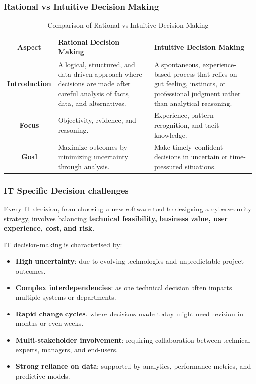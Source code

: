 \subsubsection{Rational vs Intuitive Decision Making}

\indent

\begin{table}[htbp]
\centering
\renewcommand{\arraystretch}{1.4}
\begin{tabular}{|c|p{6cm}|p{6cm}|}
\hline
\textbf{Aspect} & \textbf{Rational Decision Making} & \textbf{Intuitive Decision Making} \\
\hline

\textbf{Introduction} &
A logical, structured, and data-driven approach where decisions are made after careful analysis of facts, data, and alternatives. &
A spontaneous, experience-based process that relies on gut feeling, instincts, or professional judgment rather than analytical reasoning. \\
\hline

\textbf{Focus} &
Objectivity, evidence, and reasoning. &
Experience, pattern recognition, and tacit knowledge. \\
\hline

\textbf{Goal} &
Maximize outcomes by minimizing uncertainty through analysis. &
Make timely, confident decisions in uncertain or time-pressured situations. \\
\hline

\end{tabular}
\caption{Comparison of Rational vs Intuitive Decision Making}
\end{table}

\subsubsection{IT Specific Decision challenges}

\indent 

Every IT decision, from choosing a new software tool to designing a cybersecurity strategy, involves balancing \textbf{technical feasibility, business value, user experience, cost, and risk}.

IT decision-making is characterised by:

\begin{itemize}
    \item \textbf{High uncertainty}: due to evolving technologies and unpredictable project outcomes.
    \item \textbf{Complex interdependencies}: as one technical decision often impacts multiple systems or departments.
    \item \textbf{Rapid change cycles}: where decisions made today might need revision in months or even weeks.
    \item \textbf{Multi-stakeholder involvement}: requiring collaboration between technical experts, managers, and end-users.
    \item \textbf{Strong reliance on data}: supported by analytics, performance metrics, and 
predictive models.
\end{itemize}

